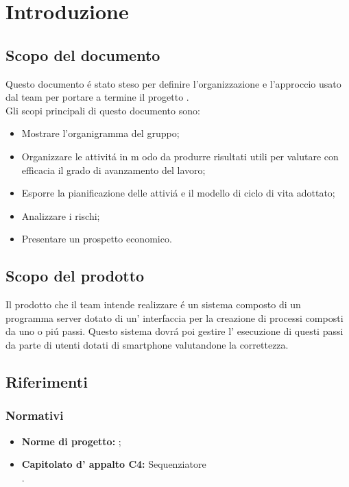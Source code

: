 \section{Introduzione}
\subsection{Scopo del documento}
Questo documento \'e stato steso per definire l'organizzazione e l'approccio usato dal team \gruppo per portare a termine il progetto \progetto. \\
Gli scopi principali di questo documento sono:
\begin{itemize}
  \item Mostrare l'organigramma del gruppo;
  \item Organizzare le attivit\'a in m
odo da produrre risultati utili per 
valutare con efficacia il grado di avanzamento del lavoro;
  \item	Esporre la pianificazione delle attivi\'a e il modello di ciclo di vita adottato;
  \item Analizzare i rischi;
  \item Presentare un prospetto economico.
\end{itemize}

\subsection{Scopo del prodotto}
Il prodotto che il team \gruppo intende realizzare \'e un sistema composto di un programma server dotato di un' interfaccia per la creazione di processi composti da uno o pi\'u passi. Questo sistema dovr\'a poi gestire l' esecuzione di questi passi da parte di utenti dotati di smartphone valutandone la correttezza.\\

\subsection{Riferimenti}

\subsubsection{Normativi}
\begin{itemize}
	\item \textbf{Norme di progetto:} \infoNDP ;
	\item \textbf{Capitolato d' appalto C4:} Sequenziatore\\ \capitolato .
\end{itemize}
